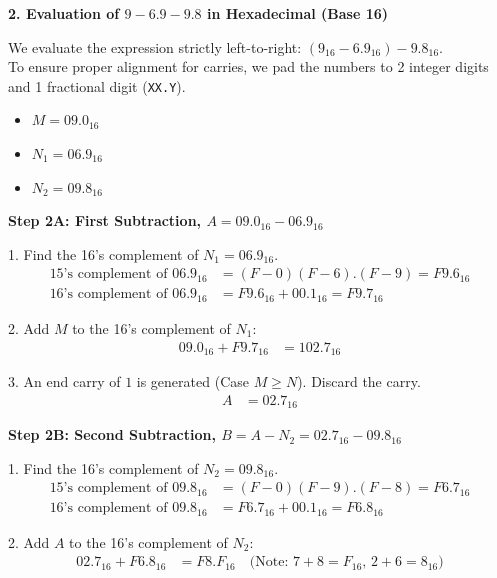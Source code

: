 \documentclass[12pt,a3paper]{article}
\begin{document}
\begin{enumerate}
\begin{tcolorbox}[enhanced,breakable,ansbox,colback=cD!4,colframe=cD,boxrule=0.8pt,arc=5pt,title={\textbf{Answer}},fonttitle=\bfseries\color{white},colbacktitle=cD]
\vspace{1em}
\textbf{\textcolor{cD}{2. Evaluation of $9 - 6.9 - 9.8$ in Hexadecimal (Base 16)}}

We evaluate the expression strictly left-to-right: $(9_{16} - 6.9_{16}) - 9.8_{16}$. \\
To ensure proper alignment for carries, we pad the numbers to 2 integer digits and 1 fractional digit (\texttt{XX.Y}).
\begin{itemize}
    \item $M = 09.0_{16}$
    \item $N_1 = 06.9_{16}$
    \item $N_2 = 09.8_{16}$
\end{itemize}

\vspace{0.5em}
\textbf{Step 2A: First Subtraction, $A = 09.0_{16} - 06.9_{16}$}

1. Find the 16's complement of $N_1 = 06.9_{16}$.
\begin{align*}
    \text{15's complement of } 06.9_{16} &= (F - 0)(F - 6).(F - 9) = F9.6_{16} \\
    \text{16's complement of } 06.9_{16} &= F9.6_{16} + 00.1_{16} = F9.7_{16}
\end{align*}

2. Add $M$ to the 16's complement of $N_1$:
\begin{align*}
    09.0_{16} + F9.7_{16} &= 102.7_{16}
\end{align*}

3. An end carry of $1$ is generated (Case $M \geq N$). Discard the carry.
\begin{align*}
    A &= 02.7_{16}
\end{align*}

\vspace{0.5em}
\textbf{Step 2B: Second Subtraction, $B = A - N_2 = 02.7_{16} - 09.8_{16}$}

1. Find the 16's complement of $N_2 = 09.8_{16}$.
\begin{align*}
    \text{15's complement of } 09.8_{16} &= (F - 0)(F - 9).(F - 8) = F6.7_{16} \\
    \text{16's complement of } 09.8_{16} &= F6.7_{16} + 00.1_{16} = F6.8_{16}
\end{align*}

2. Add $A$ to the 16's complement of $N_2$:
\begin{align*}
    02.7_{16} + F6.8_{16} &= F8.F_{16} \quad \text{(Note: } 7+8 = F_{16} \text{, } 2+6 = 8_{16} \text{)}
\end{align*}


\end{tcolorbox}
\end{enumerate}
\end{document}
